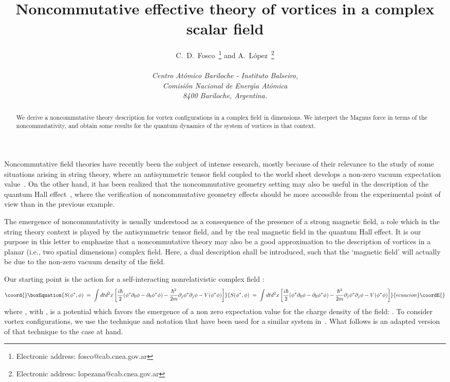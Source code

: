 \documentclass[a4paper,12pt]{article} \tolerance=200
\title{Noncommutative effective theory of vortices in a 
complex scalar field}
\author{C.~D.~Fosco\myHighlight{$^a$}\coordHE{}~\footnote{Electronic address:
    fosco@cab.cnea.gov.ar} and A.~L{\'o}pez\myHighlight{$^a$}\coordHE{}~\footnote{Electronic
    address: lopezana@cab.cnea.gov.ar}
  \\ \\
  {\normalsize\it \myHighlight{$^b$}\coordHE{}Centro At{\'o}mico Bariloche - Instituto Balseiro,}\\
  {\normalsize\it Comisi{\'o}n Nacional de Energ{\'\i}a At{\'o}mica}\\
  {\normalsize\it 8400 Bariloche, Argentina.}}  \date{}
\begin{document}
\maketitle
\begin{abstract}
\noindent We derive a noncommutative theory description for vortex
configurations in a complex field in \coordHE{} dimensions.  We interpret
the Magnus force in terms of the noncommutativity, and obtain some
results for the quantum dynamics of the system of vortices in that
context.
\end{abstract}
\newpage 
Noncommutative field theories have recently been the subject of
intense research, mostly because of their relevance to the study of
some situations arising in string theory, where an antisymmetric
tensor field coupled to the world sheet develops a non-zero vacuum
expectation value~\cite{DN,castellani}. On the other hand, it has been
realized that the noncommutative geometry setting may also be useful
in the description of the quantum Hall
effect~\cite{susskind,AP,KS,MaSt}, where the verification of
noncommutative geometry effects should be more accessible from the
experimental point of view than in the previous example.

The emergence of noncommutativity is usually understood as a
consequence of the presence of a strong magnetic field, a role which
in the string theory context is played by the antisymmetric tensor
field, and by the real magnetic field in the quantum Hall effect. It
is our purpose in this letter to emphasize that a noncommutative
theory may also be a good approximation to the description of vortices
in a planar (i.e., two spatial dimensions) complex field.  Here, a
dual description shall be introduced, such that the `magnetic field'
will actually be due to the non-zero vacuum density of the field.


Our starting point is the action for a self-interacting
nonrelativistic complex field \myHighlight{$\phi$}\coordHE{}:
\begin{equation}\coord{}\boxEquation{\label{eq:defs} 
S(\phi^*,\phi) \;=\; \int dt d^2x
\left[
\frac{i\hbar}{2} (\phi^* \partial_0 \phi - \partial_0 \phi^*\phi) 
- \frac{\hbar^2}{2 m}\partial_j\phi^* \partial_j \phi - V(\phi^*\phi) 
\right]
}{S(\phi^*,\phi) \;=\; \int dt d^2x
\left[
\frac{i\hbar}{2} (\phi^* \partial_0 \phi - \partial_0 \phi^*\phi) 
- \frac{\hbar^2}{2 m}\partial_j\phi^* \partial_j \phi - V(\phi^*\phi) 
\right]
}{ecuacion}\coordE{}\end{equation}
where \coordHE{}, with \coordHE{}, is a
potential which favors the emergence of a non zero expectation value
for the charge density of the field: \myHighlight{$\rho\,=\,\phi^*\phi$}\coordHE{}. To consider vortex
configurations, we use the technique and notation that have been used
for a similar system in~\cite{Zhang,MS}. What follows is an adapted
version of that technique to the case at hand.
\end{document}
